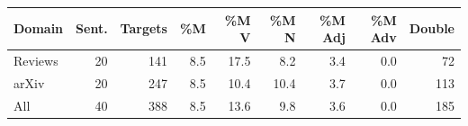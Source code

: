 \begin{tabular}{lrrrrrrrr}
\toprule
Domain & Sent. & Targets & \%M & \%M V & \%M N & \%M Adj & \%M Adv & Double \\
\midrule
Reviews & 20 & 141 & 8.5 & 17.5 & 8.2 & 3.4 & 0.0 & 72 \\
arXiv & 20 & 247 & 8.5 & 10.4 & 10.4 & 3.7 & 0.0 & 113 \\
\midrule
All & 40 & 388 & 8.5 & 13.6 & 9.8 & 3.6 & 0.0 & 185 \\
\bottomrule
\end{tabular}
